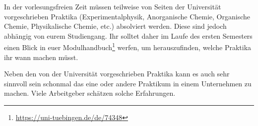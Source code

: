 In der vorlesungsfreien Zeit müssen teilweise von Seiten der Universität vorgeschrieben Praktika (Experimentalphysik, Anorganische Chemie, Organische Chemie, Physikalische Chemie, etc.) absolviert werden. Diese sind jedoch abhängig von eurem Studiengang. Ihr solltet daher im Laufe des ersten Semesters einen Blick in euer Modulhandbuch\footnote{\url{https://uni-tuebingen.de/de/74348}} werfen, um herauszufinden, welche Praktika ihr wann machen müsst.	%

Neben den von der Universität vorgeschrieben Praktika kann es auch sehr sinnvoll sein schonmal das eine oder andere Praktikum in einem Unternehmen zu machen. Viele Arbeitgeber schätzen solche Erfahrungen.

